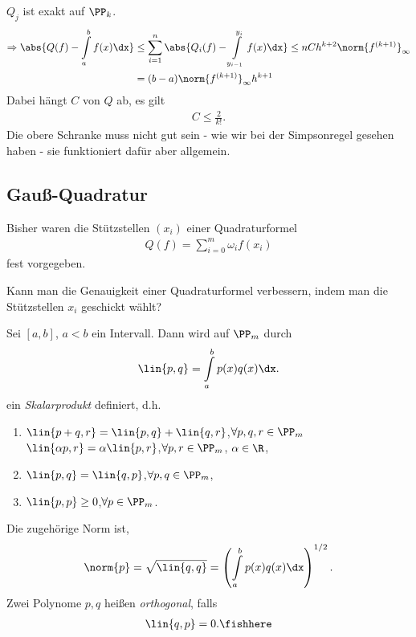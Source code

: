 \begin{bemn}[Voraussetzung.]
$Q_j$ ist exakt auf $\PP_k$.
\begin{align*}
\Rightarrow \abs{Q(f)-\int\limits_a^b f(x)\dx} &\le \sum\limits_{i=1}^n
\abs{Q_i(f)-\int\limits_{y_{i-1}}^{y_i} f(x)\dx}
\le nCh^{k+2}\norm{f^{(k+1)}}_\infty \\ &= (b-a)\norm{f^{(k+1)}}_\infty
h^{k+1}
\end{align*}
Dabei hängt $C$ von $Q$ ab, es gilt
\begin{align*}
C \le \frac{2}{k!}.
\end{align*}
Die obere Schranke muss nicht gut sein - wie wir bei der Simpsonregel gesehen
haben - sie funktioniert dafür aber allgemein.
\end{bemn} 

\subsection{Gauß-Quadratur}

Bisher waren die Stützstellen $(x_i)$ einer Quadraturformel
\begin{align*}
Q(f) = \sum\limits_{i=0}^m \omega_i f(x_i)
\end{align*}
fest vorgegeben.

\begin{bemn}[Frage:]
Kann man die Genauigkeit einer Quadraturformel verbessern, indem man die
Stützstellen $x_i$ geschickt wählt?
\end{bemn}

\begin{defnn}[Hilfsmittel]
Sei $[a,b]$, $a<b$ ein Intervall. Dann wird auf $\PP_m$ durch
\begin{align*}
\lin{p,q} = \int\limits_a^b p(x)q(x)\dx.
\end{align*}
ein \emph{Skalarprodukt} definiert, d.h.
\begin{enumerate}[label=(\roman{*})]
\item $\lin{p+q,r} = \lin{p,q}+\lin{q,r}$,\quad $\forall p,q,r\in\PP_m$\\
$\lin{\alpha p,r} = \alpha\lin{p,r}$,\quad $\forall p,r\in\PP_m$, $\alpha\in\R$,
\item $\lin{p,q}=\lin{q,p}$,\quad $\forall p,q\in\PP_m$,
\item $\lin{p,p} \ge 0$,\quad $\forall p\in\PP_m$.
\end{enumerate}
Die zugehörige Norm ist,
\begin{align*}
\norm{p} = \sqrt{\lin{q,q}} = \left(\int\limits_a^b p(x)q(x)\dx \right)^{1/2}.
\end{align*}
Zwei Polynome $p,q$ heißen \emph{orthogonal}, falls
\begin{align*}
\lin{q,p} = 0.\fishhere
\end{align*}
\end{defnn}

